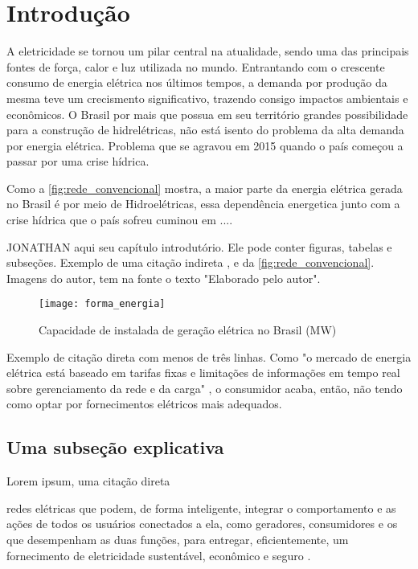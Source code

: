 \chapter[Introdução]{Introdução}
\label{ch:introdução}
A eletricidade se tornou um pilar central na atualidade, sendo uma das principais fontes de força, calor e luz utilizada no  mundo. Entrantando com o
crescente consumo de energia elétrica nos últimos tempos, a demanda por produção da mesma teve um crecismento significativo, trazendo consigo 
impactos ambientais e econômicos. O Brasil por mais que possua em seu território grandes possibilidade para a construção de hidrelétricas, não
está isento do problema da alta demanda por energia elétrica. Problema que se agravou em 2015 quando o país começou a passar por
uma crise hídrica.

Como a \autoref{fig:rede_convencional} mostra, a maior parte da energia elétrica gerada no Brasil é por meio de Hidroelétricas, essa dependência
energetica junto com a crise hídrica que o país sofreu cuminou em ....


JONATHAN aqui seu capítulo introdutório. Ele pode conter figuras, tabelas e subseções. Exemplo de uma citação indireta \cite{yu2011new}, e da \autoref{fig:rede_convencional}. Imagens do autor, tem na fonte o texto "Elaborado pelo autor".

\begin{figure}[h!]
	\texttt{[image: forma\_energia]}
	\centering
	\caption[Capacidade de instalada de geração elétrica no Brasil (MW)]{Capacidade de instalada de geração elétrica no Brasil (MW)}
	\label{fig:rede_convencional}
\end{figure}
\FloatBarrier

Exemplo de citação direta com menos de três linhas. Como "o mercado de energia elétrica está baseado em tarifas fixas e limitações de informações em tempo real sobre gerenciamento da rede e da carga" \cite[p. 15]{cgee}, o consumidor acaba, então, não tendo como optar por fornecimentos elétricos mais adequados. 


\section{Uma subseção explicativa}

Lorem ipsum, uma citação direta 

\begin{citacao}[brazil]
[...] redes elétricas que podem, de forma inteligente, integrar o comportamento e as ações de todos os usuários conectados a ela, como geradores, consumidores e os que desempenham as duas funções, para entregar, eficientemente, um fornecimento de eletricidade sustentável, econômico e seguro \cite[p. 51, tradução livre]{yu2011new}.
\end{citacao}

